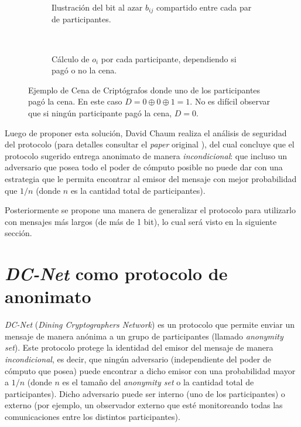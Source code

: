 \begin{figure}[H]
\centering
\begin{subfigure}[b]{0.4\textwidth}
    
    \caption{Ilustración del bit al azar $b_{ij}$ compartido entre cada par de 
    participantes.}
    \label{2a}
\end{subfigure}
~
\begin{subfigure}[b]{0.4\textwidth}
    
    \caption{Cálculo de $o_i$ por cada participante, dependiendo si pagó o no 
    la cena.}
    \label{2b}
\end{subfigure}

\protect\caption{Ejemplo de Cena de Criptógrafos donde uno de los 
participantes pagó la cena. En este caso $D = 0 \oplus 0 \oplus 1 = 1$. 
No es difícil observar que si ningún participante pagó la cena, $D = 0$.}
\label{fig:example_dcnet_chaum}
\end{figure}

Luego de proponer esta solución, David Chaum realiza el análisis de seguridad 
del protocolo (para detalles consultar el \emph{paper} original 
\cite{chaum1988dining}), del cual concluye que el protocolo sugerido entrega 
anonimato de manera \emph{incondicional}: que incluso un adversario que posea 
todo el poder de cómputo posible no puede dar con una estrategia que le 
permita encontrar al emisor del mensaje con mejor probabilidad que $1/n$ 
(donde $n$ es la cantidad total de participantes).

Posteriormente se propone una manera de generalizar el protocolo para 
utilizarlo con mensajes más largos (de más de 1 bit), lo cual será 
visto en la siguiente sección.

\section{\emph{DC-Net} como protocolo de anonimato}

\emph{DC-Net} (\emph{Dining Cryptographers Network}) es un protocolo que 
permite enviar un mensaje de manera anónima a un grupo de participantes 
(llamado \emph{anonymity set}). Este protocolo protege la identidad del emisor 
del mensaje de manera \emph{incondicional}, es decir, que ningún adversario 
(independiente del poder de cómputo que posea) puede encontrar a dicho emisor 
con una probabilidad mayor a $1/n$ (donde $n$ es el tamaño del 
\emph{anonymity set} o la cantidad total de participantes). Dicho adversario 
puede ser interno (uno de los participantes) o externo (por ejemplo, un 
observador externo que esté monitoreando todas las comunicaciones entre los 
distintos participantes).

